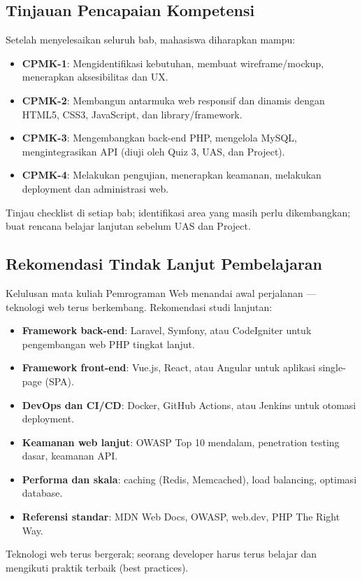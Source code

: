 \subsection{Tinjauan Pencapaian Kompetensi}

Setelah menyelesaikan seluruh bab, mahasiswa diharapkan mampu:

\begin{itemize}
  \item \textbf{CPMK-1}: Mengidentifikasi kebutuhan, membuat wireframe/mockup, menerapkan aksesibilitas dan UX.
  \item \textbf{CPMK-2}: Membangun antarmuka web responsif dan dinamis dengan HTML5, CSS3, JavaScript, dan library/framework.
  \item \textbf{CPMK-3}: Mengembangkan back-end PHP, mengelola MySQL, mengintegrasikan API (diuji oleh Quiz 3, UAS, dan Project).
  \item \textbf{CPMK-4}: Melakukan pengujian, menerapkan keamanan, melakukan deployment dan administrasi web.
\end{itemize}

Tinjau checklist di setiap bab; identifikasi area yang masih perlu dikembangkan; buat rencana belajar lanjutan sebelum UAS dan Project.

\subsection{Rekomendasi Tindak Lanjut Pembelajaran}

Kelulusan mata kuliah Pemrograman Web menandai awal perjalanan --- teknologi web terus berkembang. Rekomendasi studi lanjutan:

\begin{itemize}
  \item \textbf{Framework back-end}: Laravel, Symfony, atau CodeIgniter untuk pengembangan web PHP tingkat lanjut.
  \item \textbf{Framework front-end}: Vue.js, React, atau Angular untuk aplikasi single-page (SPA).
  \item \textbf{DevOps dan CI/CD}: Docker, GitHub Actions, atau Jenkins untuk otomasi deployment.
  \item \textbf{Keamanan web lanjut}: OWASP Top 10 mendalam, penetration testing dasar, keamanan API.
  \item \textbf{Performa dan skala}: caching (Redis, Memcached), load balancing, optimasi database.
  \item \textbf{Referensi standar}: MDN Web Docs, OWASP, web.dev, PHP The Right Way.
\end{itemize}

Teknologi web terus bergerak; seorang developer harus terus belajar dan mengikuti praktik terbaik (best practices).

